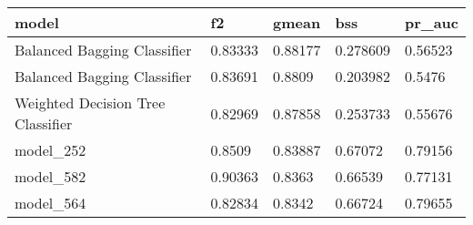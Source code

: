 \begin{tabular}{|l|l|l|l|l|}
\hline
\textbf{model}                    & \textbf{f2} & \textbf{gmean} & \textbf{bss} & \textbf{pr\_auc} \\ \hline
Balanced Bagging Classifier       & 0.83333     & 0.88177        & 0.278609     & 0.56523          \\ \hline
Balanced Bagging Classifier       & 0.83691     & 0.8809         & 0.203982     & 0.5476           \\ \hline
Weighted Decision Tree Classifier & 0.82969     & 0.87858        & 0.253733     & 0.55676          \\ \hline
model\_252                        & 0.8509      & 0.83887        & 0.67072      & 0.79156          \\ \hline
model\_582                        & 0.90363     & 0.8363         & 0.66539      & 0.77131          \\ \hline
model\_564                        & 0.82834     & 0.8342         & 0.66724      & 0.79655          \\ \hline
\end{tabular}